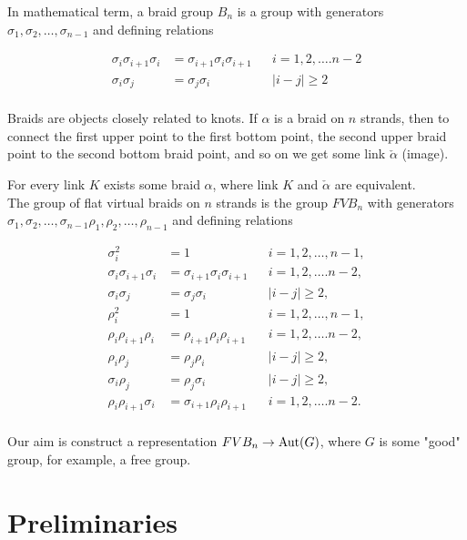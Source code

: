 \documentclass{article}
\begin{document}
In mathematical term, a braid group $B_n$ is a group with generators $\sigma _1,\sigma _2,\dots,\sigma _{n-1}$ and defining relations 

\begin{align*}
\sigma _i\sigma _{i+1}\sigma _i &= \sigma _{i+1}\sigma _i\sigma _{i+1}&&i = 1, 2, \dots. n-2\\
\sigma _i\sigma _j &= \sigma _j\sigma _i&&|i-j|\geqslant   2\\
\end{align*}


Braids are objects closely related to knots. If $\alpha$ is a braid on $n$ strands, then to connect the first upper point to the first bottom point, the second upper braid point to the second bottom braid point, and so on we get some link $\check  \alpha$ (image).

For every link $K$ exists some braid $\alpha$, where link $K$ and $\check  \alpha$ are equivalent.\\


The group of flat virtual braids on $n$ strands is the group $FVB_n$ with generators  $\sigma _1,\sigma _2,\dots,\sigma _{n-1}\rho_1,\rho _2,\dots,\rho _{n-1}$ and defining relations 

\begin{equation}\label{def}
\begin{align*}
\sigma_i^2&=1 && i = 1, 2, \dots,n-1,\\
\sigma_i\sigma _{i+1}\sigma _i &= \sigma _{i+1}\sigma _i\sigma _{i+1}&& i = 1, 2, \dots. n-2, \\
\sigma _i\sigma _j &= \sigma _j\sigma _i && |i-j|\geqslant   2,\\
\rho_i^2&=1 &&i = 1, 2, \dots,n-1, \\
\rho_i\rho _{i+1}\rho _i &= \rho _{i+1}\rho_i\rho _{i+1} &&i = 1, 2, \dots. n-2,\\
\rho _i\rho _j &= \rho _j\rho _i && |i-j|\geqslant 2,\\
\sigma _i\rho _j &= \rho _j\sigma _i &&|i-j|\geqslant   2,\\
\rho_i\rho _{i+1}\sigma _i &= \sigma _{i+1}\rho_i\rho _{i+1} && i = 1, 2, \dots. n-2.\\
\end{align*}
\end{equation}

Our aim is construct a representation $FVB_n \rightarrow {\rm Aut} (G)$, where $G$ is some "good" group, for example, a free group.
\section{Preliminaries}
\end{document}
